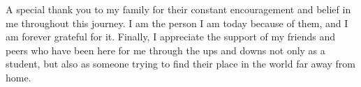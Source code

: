 \documentclass[12pt]{article}
\begin{document}
\medskip
\noindent A special thank you to my family for their constant encouragement and belief in me throughout this journey. I am the person I am today because of them, and I am forever grateful for it. Finally, I appreciate the support of my friends and peers who have been here for me through the ups and downs not only as a student, but also as someone trying to find their place in the world far away from home.








\end{document}
